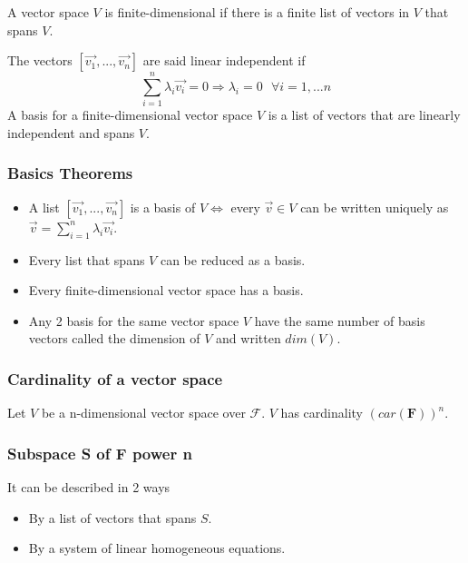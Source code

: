 \documentclass{article}
\begin{document}
A vector space $ V $ is finite-dimensional if there is a finite list of vectors in $ V $ that spans $ V $.

The vectors $ [\vec{v_1},...,\vec{v_n}] $ are said linear independent if 
\begin{equation}
\sum_{i=1}^{n} \lambda_i\vec{v_i} = 0 \Rightarrow \lambda_i = 0 \textit{  } \forall i = 1,...n
\end{equation}
A basis for a finite-dimensional vector space $ V $ is a list of vectors that are linearly independent and spans $ V $.

\subsubsection{Basics Theorems}
\begin{itemize}
\item A list $ [\vec{v_1},...,\vec{v_n}] $ is a basis of $ V \Longleftrightarrow $ every $ \vec{v} \in V $ can be written uniquely as $ \vec{v} = \sum_{i=1}^{n} \lambda_i\vec{v_i} $.
\item Every list that spans $ V $ can be reduced as a basis.
\item Every finite-dimensional vector space has a basis.
\item Any 2 basis for the same vector space $ V $ have the same number of basis vectors called the dimension of $ V $ and written $ dim(V) $.
\end{itemize}

\subsubsection{Cardinality of a vector space}  
\begin{tcolorbox}[sharp corners, colback=green!30, colframe=green!80!blue, title=Cardinality of vector spaces]
Let $ V $ be a n-dimensional vector space over $ \mathcal{F} $. $ V $ has cardinality $ (car(\mathbf{F}))^n $.
\end{tcolorbox} 

\subsubsection{Subspace S of F power n}
It can be described in 2 ways
\begin{itemize}
\item By a list of vectors that spans $ S $.
\item By a system of linear homogeneous equations.
\end{itemize}
\end{document}

